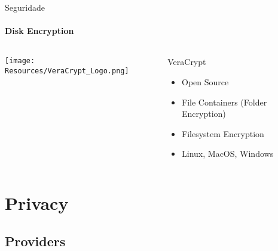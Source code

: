 \documentclass{beamer}
\begin{document}
\begin{frame}{Seguridade}
  \framesubtitle{Disk Encryption}

  \begin{columns}
    \begin{column}{0.5\textwidth}
      \texttt{[image: Resources/VeraCrypt\_Logo.png]}

      \vspace{1cm}



    \end{column}

    \begin{column}{0.5\textwidth}
      \begin{block}{VeraCrypt}
        \begin{itemize}
          \item Open Source
          \item File Containers (Folder Encryption)
          \item Filesystem Encryption
          \item Linux, MacOS, Windows
        \end{itemize}
      \end{block}
    \end{column}

  \end{columns}

\end{frame}



\section{Privacy}
\subsection{Providers}



\end{document}
